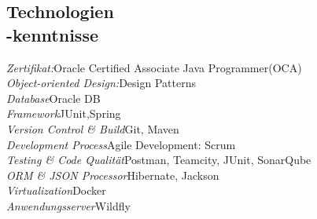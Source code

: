 \documentclass[margin, 10pt]{res} %
\begin{document}
\begin{resume}

 




\newcommand\tab[1][1cm]{\hspace*{#1}}
\section{Technologien\\-kenntnisse} 

{\sl Zertifikat:}\hfill		Oracle Certified Associate Java Programmer(OCA)\\
{\sl Object-oriented Design:}\hfill 		Design Patterns\\
{\sl Database}\hfill 							Oracle DB\\ 
{\sl Framework}\hfill  						JUnit,Spring\\
{\sl Version Control \& Build}\hfill 		Git, Maven\\
{\sl Development Process}\hfill 			Agile Development: Scrum\\
{\sl Testing \& Code Qualität}\hfill 		Postman, Teamcity, JUnit, SonarQube\\
{\sl ORM \& JSON Processor}\hfill 					Hibernate, Jackson\\
{\sl Virtualization}\hfill 								 	Docker\\
{\sl Anwendungsserver}\hfill 							Wildfly


\end{resume}
\end{document}
